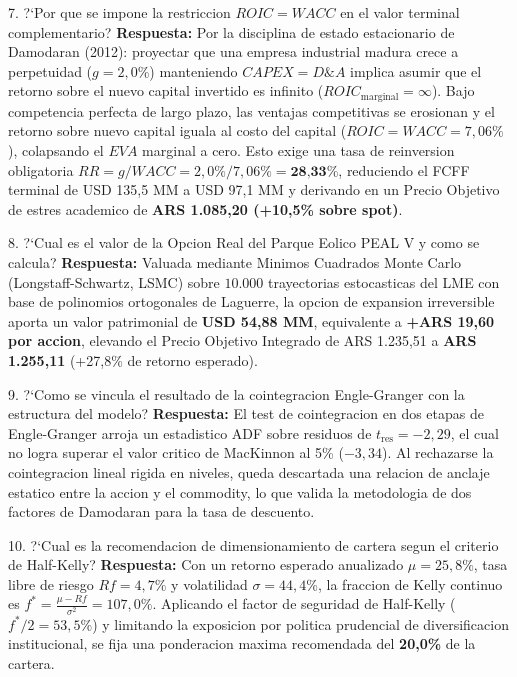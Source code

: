 \documentclass[10pt,a4paper]{article}
\theoremstyle{definition}
\begin{document}
\begin{examquestion}{7. ?`Por que se impone la restriccion $ROIC = WACC$ en el valor terminal complementario?}
\textbf{Respuesta:} Por la disciplina de estado estacionario de Damodaran (2012): proyectar que una empresa industrial madura crece a perpetuidad ($g = 2,0\%$) manteniendo $CAPEX = D\&A$ implica asumir que el retorno sobre el nuevo capital invertido es infinito ($ROIC_{\text{marginal}} = \infty$). Bajo competencia perfecta de largo plazo, las ventajas competitivas se erosionan y el retorno sobre nuevo capital iguala al costo del capital ($ROIC = WACC = 7,06\%$), colapsando el $EVA$ marginal a cero. Esto exige una tasa de reinversion obligatoria $RR = g/WACC = 2,0\% / 7,06\% = \textbf{28,33\%}$, reduciendo el FCFF terminal de USD 135,5 MM a USD 97,1 MM y derivando en un Precio Objetivo de estres academico de \textbf{ARS 1.085,20 (+10,5\% sobre spot)}.
\end{examquestion}

\begin{examquestion}{8. ?`Cual es el valor de la Opcion Real del Parque Eolico PEAL V y como se calcula?}
\textbf{Respuesta:} Valuada mediante Minimos Cuadrados Monte Carlo (Longstaff-Schwartz, LSMC) sobre $10.000$ trayectorias estocasticas del LME con base de polinomios ortogonales de Laguerre, la opcion de expansion irreversible aporta un valor patrimonial de \textbf{USD 54,88 MM}, equivalente a \textbf{+ARS 19,60 por accion}, elevando el Precio Objetivo Integrado de ARS 1.235,51 a \textbf{ARS 1.255,11} (+27,8\% de retorno esperado).
\end{examquestion}

\begin{examquestion}{9. ?`Como se vincula el resultado de la cointegracion Engle-Granger con la estructura del modelo?}
\textbf{Respuesta:} El test de cointegracion en dos etapas de Engle-Granger arroja un estadistico ADF sobre residuos de $t_{\text{res}} = -2,29$, el cual no logra superar el valor critico de MacKinnon al 5\% ($-3,34$). Al rechazarse la cointegracion lineal rigida en niveles, queda descartada una relacion de anclaje estatico entre la accion y el commodity, lo que valida la metodologia de dos factores de Damodaran para la tasa de descuento.
\end{examquestion}

\begin{examquestion}{10. ?`Cual es la recomendacion de dimensionamiento de cartera segun el criterio de Half-Kelly?}
\textbf{Respuesta:} Con un retorno esperado anualizado $\mu = 25,8\%$, tasa libre de riesgo $Rf = 4,7\%$ y volatilidad $\sigma = 44,4\%$, la fraccion de Kelly continuo es $f^* = \frac{\mu - Rf}{\sigma^2} = 107,0\%$. Aplicando el factor de seguridad de Half-Kelly ($f^* / 2 = 53,5\%$) y limitando la exposicion por politica prudencial de diversificacion institucional, se fija una ponderacion maxima recomendada del \textbf{20,0\%} de la cartera.
\end{examquestion}
\end{document}
